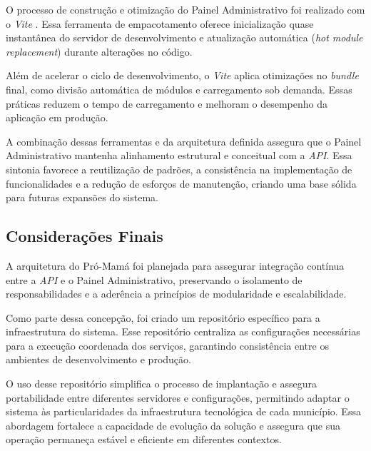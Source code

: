 O processo de construção e otimização do Painel Administrativo foi realizado com o \emph{Vite} \cite{vite}. Essa ferramenta de empacotamento oferece inicialização quase instantânea do servidor de desenvolvimento e atualização automática (\emph{hot module replacement}) durante alterações no código.

Além de acelerar o ciclo de desenvolvimento, o \emph{Vite} aplica otimizações no \emph{bundle} final, como divisão automática de módulos e carregamento sob demanda. Essas práticas reduzem o tempo de carregamento e melhoram o desempenho da aplicação em produção.

A combinação dessas ferramentas e da arquitetura definida assegura que o Painel Administrativo mantenha alinhamento estrutural e conceitual com a \emph{API}. Essa sintonia favorece a reutilização de padrões, a consistência na implementação de funcionalidades e a redução de esforços de manutenção, criando uma base sólida para futuras expansões do sistema.

\subsection{Considerações Finais}

A arquitetura do Pró-Mamá foi planejada para assegurar integração contínua entre a \emph{API} e o Painel Administrativo, preservando o isolamento de responsabilidades e a aderência a princípios de modularidade e escalabilidade.

Como parte dessa concepção, foi criado um repositório específico para a infraestrutura do sistema. Esse repositório centraliza as configurações necessárias para a execução coordenada dos serviços, garantindo consistência entre os ambientes de desenvolvimento e produção.

O uso desse repositório simplifica o processo de implantação e assegura portabilidade entre diferentes servidores e configurações, permitindo adaptar o sistema às particularidades da infraestrutura tecnológica de cada município. Essa abordagem fortalece a capacidade de evolução da solução e assegura que sua operação permaneça estável e eficiente em diferentes contextos.
